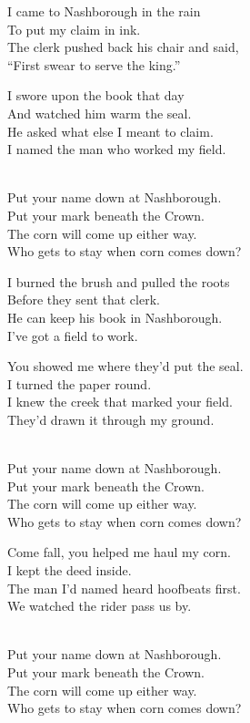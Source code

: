\begin{lyrics}
I came to Nashborough in the rain\\
To put my claim in ink.\\
The clerk pushed back his chair and said,\\
“First swear to serve the king.”

I swore upon the book that day\\
And watched him warm the seal.\\
He asked what else I meant to claim.\\
I named the man who worked my field.

\\
Put your name down at Nashborough.\\
Put your mark beneath the Crown.\\
The corn will come up either way.\\
Who gets to stay when corn comes down?


I burned the brush and pulled the roots\\
Before they sent that clerk.\\
He can keep his book in Nashborough.\\
I’ve got a field to work.

You showed me where they’d put the seal.\\
I turned the paper round.\\
I knew the creek that marked your field.\\
They’d drawn it through my ground.

\\
Put your name down at Nashborough.\\
Put your mark beneath the Crown.\\
The corn will come up either way.\\
Who gets to stay when corn comes down?

Come fall, you helped me haul my corn.\\
I kept the deed inside.\\
The man I’d named heard hoofbeats first.\\
We watched the rider pass us by.

\\
Put your name down at Nashborough.\\
Put your mark beneath the Crown.\\
The corn will come up either way.\\
Who gets to stay when corn comes down?
\end{lyrics}

